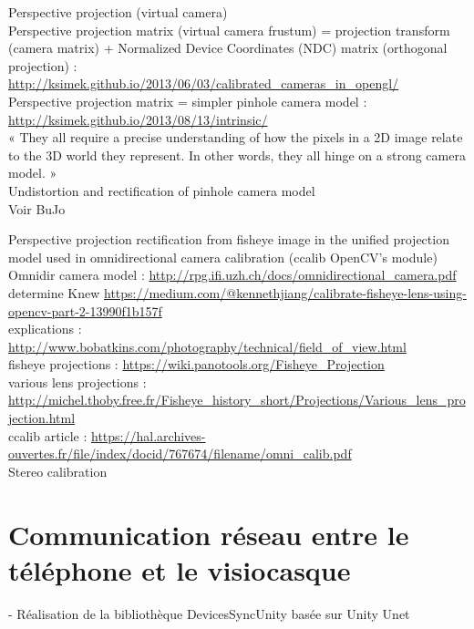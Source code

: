 Perspective projection (virtual camera)\\
Perspective projection matrix (virtual camera frustum) = projection transform (camera matrix) + Normalized Device Coordinates (NDC) matrix (orthogonal projection) : \url{http://ksimek.github.io/2013/06/03/calibrated_cameras_in_opengl/}\\
Perspective projection matrix = simpler pinhole camera model : \url{http://ksimek.github.io/2013/08/13/intrinsic/}\\
« They all require a precise understanding of how the pixels in a 2D image relate to the 3D world they represent. In other words, they all hinge on a strong camera model. »\\

Undistortion and rectification of pinhole camera model\\
Voir BuJo

Perspective projection rectification from fisheye image in the unified projection model used in omnidirectional camera calibration (ccalib OpenCV's module)\\
Omnidir camera model : \url{http://rpg.ifi.uzh.ch/docs/omnidirectional_camera.pdf}\\
determine Knew \url{https://medium.com/@kennethjiang/calibrate-fisheye-lens-using-opencv-part-2-13990f1b157f}\\
explications : \url{http://www.bobatkins.com/photography/technical/field_of_view.html}\\
fisheye projections : \url{https://wiki.panotools.org/Fisheye_Projection}\\
various lens projections : \url{http://michel.thoby.free.fr/Fisheye_history_short/Projections/Various_lens_projection.html}\\
ccalib article : \url{https://hal.archives-ouvertes.fr/file/index/docid/767674/filename/omni_calib.pdf}\\

Stereo calibration\\


\section{Communication réseau entre le téléphone et le visiocasque}
- Réalisation de la bibliothèque DevicesSyncUnity basée sur Unity Unet